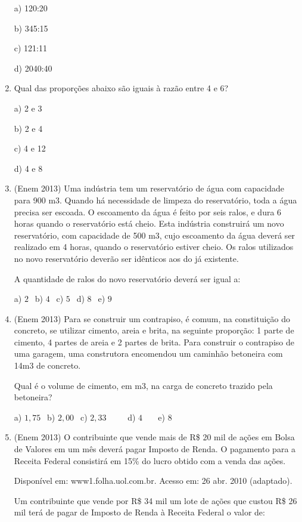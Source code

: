 \begin{multicols*}{2}
\begin{enumerate}
a) 120:20

b) 345:15

c) 121:11

d) 2040:40\\
		
		\item Qual das proporções abaixo são iguais à razão entre 4 e 6?

a) 2 e 3

b) 2 e 4

c) 4 e 12

d) 4 e 8\\
		
		\item (Enem 2013) Uma indústria tem um reservatório de água com capacidade para 900 m3. Quando há necessidade de limpeza do reservatório, toda a água precisa ser escoada. O escoamento da água é feito por seis ralos, e dura 6 horas quando o reservatório está cheio. Esta indústria construirá um novo reservatório, com capacidade de 500 m3, cujo escoamento da água deverá ser realizado em 4 horas, quando o reservatório estiver cheio. Os ralos utilizados no
novo reservatório deverão ser idênticos aos do já existente. 

A quantidade de ralos do novo reservatório deverá ser igual a:

	a) $2 \ \ $ b) $4 \ \ $ c) $5 \ \ $ d) $8 \ \ $ e) $9 \ \ $
	
		\item (Enem 2013) Para se construir um contrapiso, é comum, na constituição do concreto, se utilizar cimento, areia e brita, na seguinte proporção: 1 parte de cimento, 4 partes de areia e 2 partes de brita. Para construir o contrapiso de uma
garagem, uma construtora encomendou um caminhão betoneira com 14m3 de concreto.

Qual é o volume de cimento, em m3, na carga de concreto trazido pela betoneira?

	a) $1,75 \ \ $ b) $2,00 \ \ $ c) $2,33 \ \ \ \ \ \ \ \ \ \ $ d) $4 \ \ \ \ \ \ \ $ e) $8 \ \ $
		
		\item (Enem 2013) O contribuinte que vende mais de R\$ 20 mil de ações em Bolsa de Valores em um mês deverá pagar Imposto de Renda. O pagamento para a Receita Federal consistirá em 15\% do lucro obtido com a venda das ações.
		
Disponível em: www1.folha.uol.com.br. Acesso em: 26
abr. 2010 (adaptado).

Um contribuinte que vende por R\$ 34 mil um lote de ações que custou R\$ 26 mil terá de pagar de Imposto de Renda à
Receita Federal o valor de:


\end{enumerate}
\end{multicols*}
